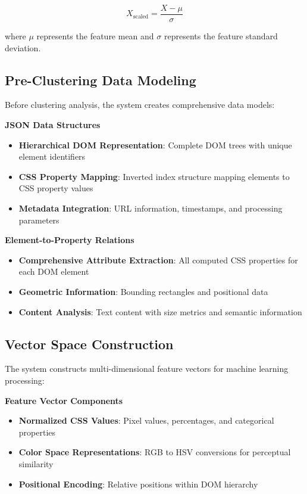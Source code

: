\begin{equation}
X_{\text{scaled}} = \frac{X - \mu}{\sigma}
\end{equation}

where $\mu$ represents the feature mean and $\sigma$ represents the feature standard deviation.

\subsection{Pre-Clustering Data Modeling}
\label{subsec:pre-clustering-modeling}

Before clustering analysis, the system creates comprehensive data models:

\textbf{JSON Data Structures}
\begin{itemize}
    \item \textbf{Hierarchical DOM Representation}: Complete DOM trees with unique element identifiers
    \item \textbf{CSS Property Mapping}: Inverted index structure mapping elements to CSS property values
    \item \textbf{Metadata Integration}: URL information, timestamps, and processing parameters
\end{itemize}

\textbf{Element-to-Property Relations}
\begin{itemize}
    \item \textbf{Comprehensive Attribute Extraction}: All computed CSS properties for each DOM element
    \item \textbf{Geometric Information}: Bounding rectangles and positional data
    \item \textbf{Content Analysis}: Text content with size metrics and semantic information
\end{itemize}

\subsection{Vector Space Construction}
\label{subsec:vector-space-construction}

The system constructs multi-dimensional feature vectors for machine learning processing:

\textbf{Feature Vector Components}
\begin{itemize}
    \item \textbf{Normalized CSS Values}: Pixel values, percentages, and categorical properties
    \item \textbf{Color Space Representations}: RGB to HSV conversions for perceptual similarity
    \item \textbf{Positional Encoding}: Relative positions within DOM hierarchy
\end{itemize}


